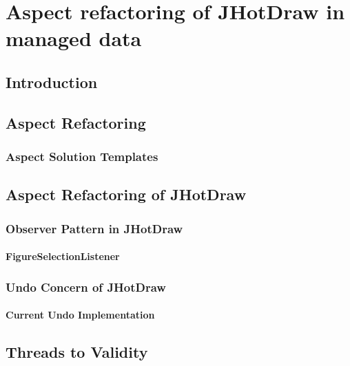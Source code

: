 
\chapter{Aspect refactoring of JHotDraw in managed data}\label{AspectRefactoring}

\section{Introduction}

\section{Aspect Refactoring}

\subsection{Aspect Solution Templates}

\section{Aspect Refactoring of JHotDraw}

\subsection{Observer Pattern in JHotDraw}\label{Observer Pattern in JHotDraw}

\subsubsection{FigureSelectionListener}

\subsection{Undo Concern of JHotDraw}\label{Undo JHotDraw}

\subsubsection{Current Undo Implementation}

\section{Threads to Validity}

